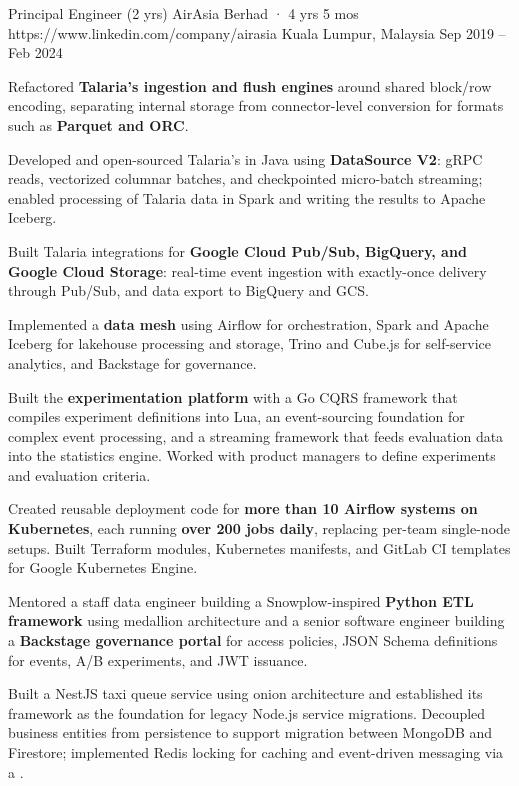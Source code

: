 \begin{cventries}
\cventry
  {Principal Engineer (2 yrs)}
  {AirAsia Berhad · 4 yrs 5 mos}
  {https://www.linkedin.com/company/airasia}
  {Kuala Lumpur, Malaysia}
  {Sep 2019 -- Feb 2024}
  {\begin{cvitems}
    \item {Refactored \textbf{Talaria's ingestion and flush engines} around shared block/row encoding, separating internal storage from connector-level conversion for formats such as \textbf{Parquet and ORC}.}
    \item {Developed and open-sourced Talaria's  in Java using \textbf{DataSource V2}: gRPC reads, vectorized columnar batches, and checkpointed micro-batch streaming; enabled processing of Talaria data in Spark and writing the results to Apache Iceberg.}
    \item {Built Talaria integrations for \textbf{Google Cloud Pub/Sub, BigQuery, and Google Cloud Storage}: real-time event ingestion with exactly-once delivery through Pub/Sub, and data export to BigQuery and GCS.}
    \item {Implemented a \textbf{data mesh} using Airflow for orchestration, Spark and Apache Iceberg for lakehouse processing and storage, Trino and Cube.js for self-service analytics, and Backstage for governance.}
    \item {Built the \textbf{experimentation platform} with a Go CQRS framework that compiles experiment definitions into Lua, an event-sourcing foundation for complex event processing, and a streaming framework that feeds evaluation data into the statistics engine. Worked with product managers to define experiments and evaluation criteria.}
    \item {Created reusable deployment code for \textbf{more than 10 Airflow systems on Kubernetes}, each running \textbf{over 200 jobs daily}, replacing per-team single-node setups. Built Terraform modules, Kubernetes manifests, and GitLab CI templates for Google Kubernetes Engine.}
    \item {Mentored a staff data engineer building a Snowplow-inspired \textbf{Python ETL framework} using medallion architecture and a senior software engineer building a \textbf{Backstage governance portal} for access policies, JSON Schema definitions for events, A/B experiments, and JWT issuance.}
    \item {Built a NestJS taxi queue service using onion architecture and established its framework as the foundation for legacy Node.js service migrations. Decoupled business entities from persistence to support migration between MongoDB and Firestore; implemented Redis locking for caching and event-driven messaging via a .}
  \end{cvitems}}

\end{cventries}
